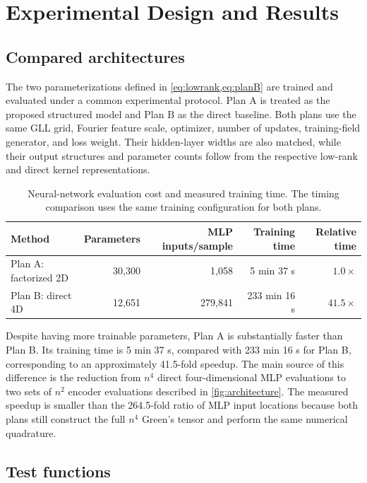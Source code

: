 \documentclass[11pt,a4paper]{article}
\begin{document}
\section{Experimental Design and Results}

\subsection{Compared architectures}

The two parameterizations defined in \cref{eq:lowrank,eq:planB} are trained and evaluated under a common experimental protocol. Plan A is treated as the proposed structured model and Plan B as the direct baseline. Both plans use the same GLL grid, Fourier feature scale, optimizer, number of updates, training-field generator, and loss weight. Their hidden-layer widths are also matched, while their output structures and parameter counts follow from the respective low-rank and direct kernel representations.

\begin{table}[H]
  \centering
  \caption{Neural-network evaluation cost and measured training time. The timing comparison uses the same training configuration for both plans.}
  \label{tab:training-cost}
  \begin{tabular}{@{}lrrrr@{}}
    \toprule
    Method & Parameters & MLP inputs/sample & Training time & Relative time \\
    \midrule
    Plan A: factorized 2D & 30,300 & 1,058 & 5 min 37 s & $1.0\times$ \\
    Plan B: direct 4D     & 12,651 & 279,841 & 233 min 16 s & $41.5\times$ \\
    \bottomrule
  \end{tabular}
\end{table}

Despite having more trainable parameters, Plan A is substantially faster than Plan B. Its training time is 5 min 37 s, compared with 233 min 16 s for Plan B, corresponding to an approximately 41.5-fold speedup. The main source of this difference is the reduction from $n^4$ direct four-dimensional MLP evaluations to two sets of $n^2$ encoder evaluations described in \cref{fig:architecture}. The measured speedup is smaller than the 264.5-fold ratio of MLP input locations because both plans still construct the full $n^4$ Green's tensor and perform the same numerical quadrature.

\subsection{Test functions}
\end{document}
